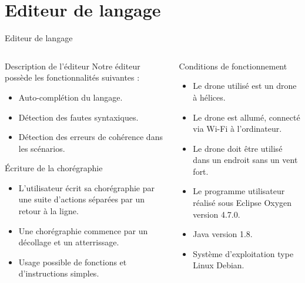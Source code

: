 \documentclass{bredelebeamer}
\begin{document}
\section{Editeur de langage}

\begin{frame}{Editeur de langage}
\begin{columns}
\begin{column}{0.5\textwidth}
\begin{block}{Description de l'éditeur}
Notre éditeur possède les fonctionnalités suivantes :
\begin{itemize}
\item Auto-complétion du langage. 
\item Détection des fautes syntaxiques.
\item Détection des erreurs de cohérence dans les scénarios.
\end{itemize}
\end{block}\pause


\begin{block}{Écriture de la chorégraphie}
\begin{itemize}
\item L'utilisateur écrit sa chorégraphie par une suite d'actions séparées par un retour à la ligne.
\item Une chorégraphie commence par un décollage et un atterrissage.
\item Usage possible de fonctions et d'instructions simples.
\end{itemize}
\end{block}\pause
\end{column}
\begin{column}{0.5\textwidth}
\begin{alertblock}{Conditions de fonctionnement}
\begin{itemize}
\item Le drone utilisé est un drone à hélices. 
\item Le drone est allumé, connecté via Wi-Fi à l’ordinateur.
\item Le drone doit être utilisé dans un endroit sans un vent fort.
\item Le programme utilisateur réalisé sous Eclipse Oxygen version 4.7.0.
\item Java version 1.8. 
\item Système d'exploitation type Linux Debian.
\end{itemize}
\end{alertblock}
\vspace{80px}
\end{column}
\end{columns}
\end{frame}
\end{document}
